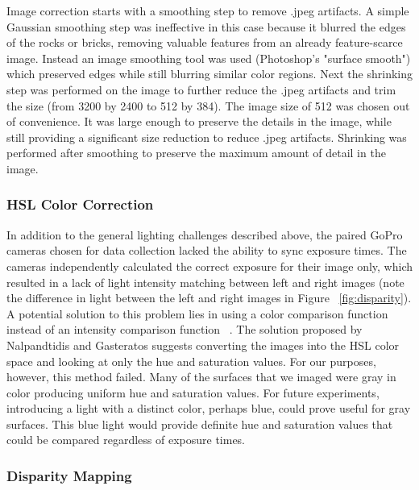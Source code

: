 \documentclass[a4paper,twoside]{article}
\begin{document}
Image correction starts with a smoothing step  to remove .jpeg artifacts.
  A simple Gaussian smoothing step was ineffective in this case because it blurred the edges of the rocks or bricks, removing valuable features from an already feature-scarce image.
  Instead an image smoothing tool was used (Photoshop's "surface smooth") which preserved edges while still blurring similar color regions.
  Next the shrinking step was performed on the image to further reduce the .jpeg artifacts and trim the size (from 3200 by 2400 to 512 by 384).
The image size of 512 was chosen out of convenience.  It was large enough to preserve the details in the image, while still providing a significant size reduction to reduce .jpeg artifacts.   
Shrinking was performed after smoothing to preserve the maximum amount of detail in the image.

\subsubsection{HSL Color Correction}
\label{subsec:hsl_color_correction}
In addition to the general lighting challenges described above, the paired GoPro cameras chosen for data collection lacked the ability to sync exposure times.
The cameras independently calculated the correct exposure for their image only, which resulted in a lack of light intensity matching between left and right images (note the difference in light between the left and right images in Figure ~\ref{fig:disparity}).
A potential solution to this problem lies in using a color comparison function instead of an intensity comparison function ~\cite{stereo:nalGast}.
The solution proposed by Nalpandtidis and Gasteratos suggests converting the images into the HSL color space and looking at only the hue and saturation values.
For our purposes, however, this method failed.  
Many of the surfaces that we imaged were gray in color producing uniform hue and saturation values.
For future experiments, introducing a light with a distinct color, perhaps blue, could prove useful for gray surfaces.  
This blue light would provide definite hue and saturation values that could be compared regardless of exposure times.

\subsubsection{Disparity Mapping}
\label{subsec:disparity_mapping}
\end{document}
